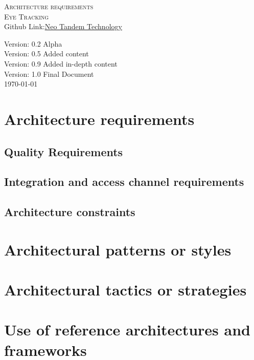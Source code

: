 \documentclass[a4paper,12pt]{report}
\begin{document}
\renewcommand{\thesection}{\arabic{section}}
\newpage
\begin{center}
\textsc{\LARGE Architecture requirements}\\[1.5cm]
\textsc{\Large Eye Tracking}\\[0.5cm]

Github Link:\href{https://github.com/MichaelNunes/Neo-Tandem-Tech-Eye-Tracking}{Neo Tandem Technology}

Version: 0.2 Alpha \\
Version: 0.5 Added content\\
Version: 0.9 Added in-depth content\\
Version: 1.0 Final Document\\
\today
\end{center}
\tableofcontents{}


\section{Architecture requirements}

\subsection{Quality Requirements}
	
\subsection{Integration and access channel requirements}
	
\subsection{Architecture constraints}
	
\section{Architectural patterns or styles}
	
\section{Architectural tactics or strategies}
	
\section{Use of reference architectures and frameworks}
	
\end{document}
